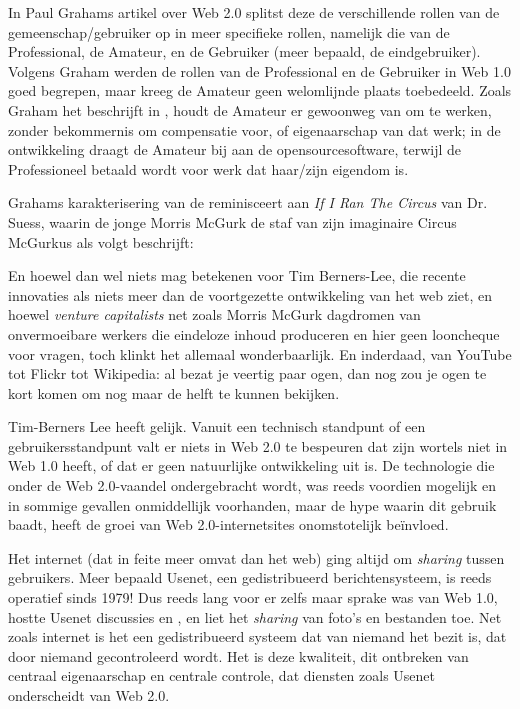 {In Paul Grahams artikel over Web 2.0 splitst deze de verschillende
rollen van de gemeenschap/gebruiker op in meer specifieke rollen,
namelijk die van de Professional, de Amateur, en de Gebruiker (meer
bepaald, de eindgebruiker). Volgens Graham werden de rollen van de
Professional en de Gebruiker in Web 1.0 goed begrepen, maar kreeg de
Amateur geen welomlijnde plaats toebedeeld. Zoals Graham het beschrijft
in , houdt de Amateur er
gewoonweg van om te werken, zonder bekommernis om compensatie voor, of
eigenaarschap van dat werk; in de ontwikkeling draagt de Amateur bij aan de opensourcesoftware,
terwijl de Professioneel betaald wordt voor werk dat haar/zijn eigendom
is.

Grahams karakterisering van de  reminisceert aan {\em If I
Ran The Circus} van Dr. Suess, waarin de jonge Morris McGurk de staf
van zijn imaginaire Circus McGurkus als volgt beschrijft:


En hoewel  dan wel niets mag betekenen voor Tim Berners{}-Lee,
die recente innovaties als niets meer dan de voortgezette ontwikkeling
van het web ziet, en hoewel {\em venture capitalists} net zoals
Morris McGurk dagdromen van onvermoeibare werkers die eindeloze inhoud
produceren en hier geen looncheque voor vragen, toch klinkt het
allemaal wonderbaarlijk. En inderdaad, van YouTube tot Flickr tot
Wikipedia: al bezat je veertig paar ogen, dan nog zou je ogen te kort
komen om nog maar de helft te kunnen bekijken.

Tim{}-Berners Lee heeft gelijk. Vanuit een technisch standpunt of een
gebruikersstandpunt valt er niets in Web 2.0 te bespeuren dat zijn
wortels niet in Web 1.0 heeft, of dat er geen natuurlijke ontwikkeling
uit is. De technologie die onder de Web 2.0{}-vaandel ondergebracht
wordt, was reeds voordien mogelijk en in sommige gevallen onmiddellijk
voorhanden, maar de hype waarin dit gebruik baadt, heeft de groei van
Web 2.0{}-internetsites onomstotelijk be\"invloed. 

Het internet (dat in feite meer omvat dan het web) ging altijd om
{\em sharing} tussen gebruikers. Meer bepaald Usenet, een
gedistribueerd berichtensysteem, is reeds operatief sinds 1979! Dus
reeds lang voor er zelfs maar sprake was van Web 1.0, hostte Usenet
discussies en , en liet het {\em sharing} van
foto's en bestanden toe. Net zoals internet is het een gedistribueerd
systeem dat van niemand het bezit is, dat door niemand gecontroleerd
wordt. Het is deze kwaliteit, dit ontbreken van centraal eigenaarschap
en centrale controle, dat diensten zoals Usenet onderscheidt van Web
2.0.

}
